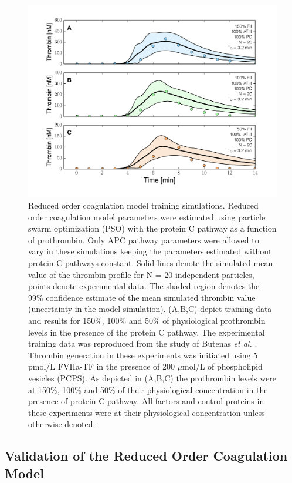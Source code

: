 \documentclass[processes,article,received,moreauthors,pdftex,12pt,a4paper]{mdpi}
\begin{document}
\begin{figure}[H]
\centering
\includegraphics[width=1.0\textwidth]{./figs/Figure-4-DIFF_FII_APC.pdf}
\caption{Reduced order coagulation model training simulations.
Reduced order coagulation model parameters were estimated using particle swarm optimization (PSO) with the protein C pathway as a function of prothrombin.
Only APC pathway parameters were allowed to vary in these simulations keeping the parameters estimated without protein C pathways constant. 
Solid lines denote the simulated mean value of the thrombin profile for N = 20 independent particles, points denote experimental data.
The shaded region denotes the 99\% confidence estimate of the mean simulated thrombin value (uncertainty in the model simulation).
(A,B,C) depict training data and results for 150\%, 100\% and 50\% of physiological prothrombin levels in the presence of the protein C pathway. 
The experimental training data was reproduced from the study of Butenas \textit{et al.} \citep{Butenas:1999aa}\citep{Veer:1997}.
Thrombin generation in these experiments was initiated using 5 pmol/L FVIIa-TF in the presence of 200 $\mu$mol/L of phospholipid vesicles (PCPS). 
As depicted in (A,B,C) the prothrombin levels were at 150\%, 100\% and 50\% of their physiological concentration in the presence of protein C pathway. 
All factors and control proteins in these experiments were at their physiological concentration unless otherwise denoted.}\label{fig-diff_fII_APC}
\end{figure}

\subsection{Validation of the Reduced Order Coagulation Model}
\end{document}
